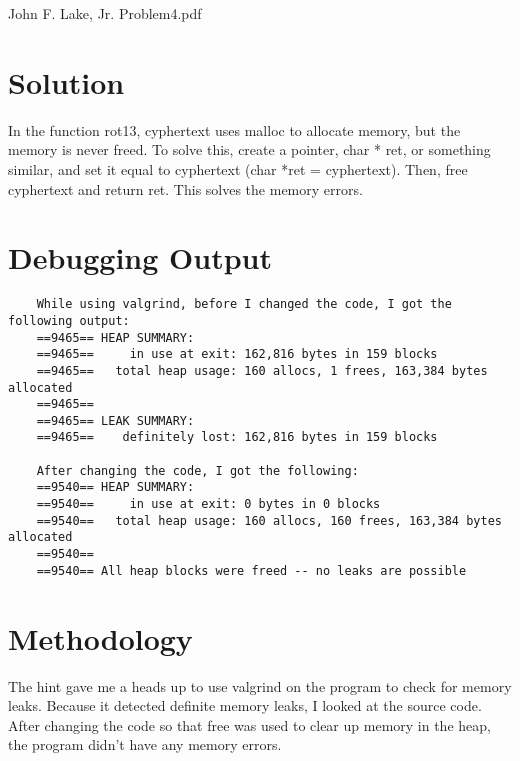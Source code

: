 \documentclass{article}
\begin{document}
John F. Lake, Jr. Problem4.pdf

\section{Solution}
	In the function rot13, cyphertext uses malloc to allocate memory, but the memory is never freed.  To solve this, create a pointer, char * ret, or something similar, 
	and set it equal to cyphertext (char *ret = cyphertext).  Then, free cyphertext and return ret. This solves the memory errors. 
\section{Debugging Output}
\begin{verbatim}
	While using valgrind, before I changed the code, I got the following output: 
	==9465== HEAP SUMMARY:
	==9465==     in use at exit: 162,816 bytes in 159 blocks
	==9465==   total heap usage: 160 allocs, 1 frees, 163,384 bytes allocated
	==9465== 
	==9465== LEAK SUMMARY:
	==9465==    definitely lost: 162,816 bytes in 159 blocks

	After changing the code, I got the following: 
	==9540== HEAP SUMMARY:
	==9540==     in use at exit: 0 bytes in 0 blocks
	==9540==   total heap usage: 160 allocs, 160 frees, 163,384 bytes allocated
	==9540== 
	==9540== All heap blocks were freed -- no leaks are possible	
\end{verbatim}
\section{Methodology}
	The hint gave me a heads up to use valgrind on the program to check for memory leaks.  Because it detected definite memory leaks, I looked at the source code.
	After changing the code so that free was used to clear up memory in the heap, the program didn't have any memory errors.  
\end{document}
